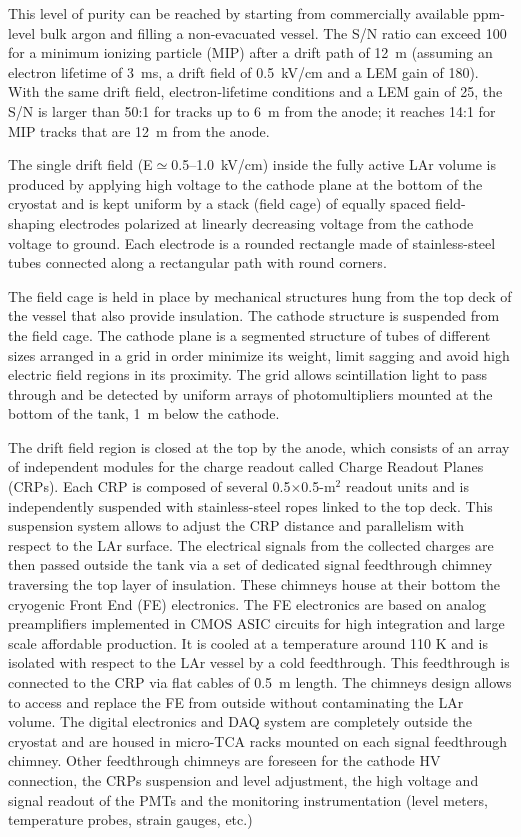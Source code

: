This level of purity can be reached by starting from commercially
available ppm-level bulk argon and filling a non-evacuated
vessel\cite{WA105_TDR}.  The S/N ratio can exceed 100 for a minimum
ionizing particle (MIP) after a drift path of 12~m (assuming an
electron lifetime of 3~ms, a drift field of 0.5~kV/cm and a LEM gain
of 180). With the same drift field, electron-lifetime conditions and a
LEM gain of 25, the S/N is larger than 50:1 for tracks up to 6~m from
the anode; it reaches 14:1 for MIP tracks that are 12~m from the
anode.

The single drift field (E${\simeq}$0.5--1.0~kV/cm) inside the fully
active LAr volume is produced by applying high voltage to the cathode
plane at the bottom of the cryostat and is kept uniform by a stack
(field cage) of equally spaced field-shaping electrodes polarized at
linearly decreasing voltage from the cathode voltage to ground. Each
electrode is a rounded rectangle made of stainless-steel tubes
connected along a rectangular path with round corners.

The field cage is held in place by mechanical structures hung from the
top deck of the vessel that also provide insulation.  The cathode
structure is suspended from the field cage. The cathode plane is a
segmented structure of tubes of different sizes arranged in a grid in
order minimize its weight, limit sagging and avoid high electric field
regions in its proximity.  The grid allows scintillation light to pass
through and be detected by uniform arrays of photomultipliers mounted
at the bottom of the tank, 1~m below the cathode.

The drift field region is closed at the top by the anode, which
consists of an array of independent modules for the charge readout
called Charge Readout Planes (CRPs). Each CRP is composed of several
0.5$\times$0.5-m$^2$ readout units and is independently suspended
with stainless-steel ropes linked to the top deck. This suspension
system allows to adjust the CRP distance and parallelism with respect
to the LAr surface. The electrical signals from the collected charges
are then passed outside the tank via a set of dedicated signal
feedthrough chimney traversing the top layer of insulation. These
chimneys house at their bottom the cryogenic Front End (FE)
electronics.  The FE electronics are based on analog preamplifiers
implemented in CMOS ASIC circuits for high integration and large scale
affordable production. It is cooled at a temperature around 110 K and
is isolated with respect to the LAr vessel by a cold feedthrough. This
feedthrough is connected to the CRP via flat cables of 0.5~m
length. The chimneys design allows to access and replace the FE from
outside without contaminating the LAr volume. The digital electronics
and DAQ system are completely outside the cryostat and are housed in
micro-TCA racks mounted on each signal feedthrough chimney. Other
feedthrough chimneys are foreseen for the cathode HV connection, the
CRPs suspension and level adjustment, the high voltage and signal
readout of the PMTs and the monitoring instrumentation (level meters,
temperature probes, strain gauges, etc.)

